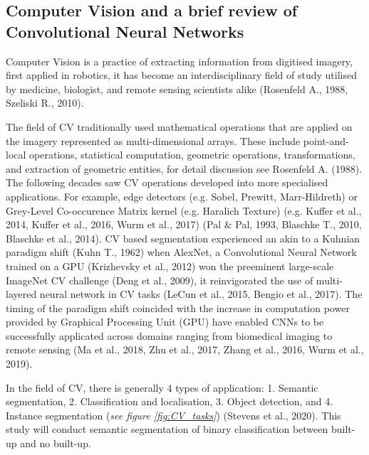 \documentclass[11pt, a4paper, twoside]{report}
\begin{document}
\subsection{Computer Vision and a brief review of Convolutional Neural Networks}\label{CVinBS}

Computer Vision is a practice of extracting information from digitised imagery, first applied in robotics, it has become an interdisciplinary field of study utilised by medicine, biologist, and remote sensing scientists alike (Rosenfeld A., 1988, Szeliski R., 2010).\\\par

The field of CV traditionally used mathematical operations that are applied on the imagery represented as multi-dimensional arrays. These include point-and-local operations, statistical computation, geometric operations, transformations, and extraction of geometric entities, for detail discussion see Rosenfeld A. (1988). The following decades saw CV operations developed into more specialised applications. For example, edge detectors (e.g. Sobel, Prewitt, Marr-Hildreth) or Grey-Level Co-occurence Matrix kernel (e.g. Haralich Texture) (e.g. Kuffer et al., 2014, Kuffer et al., 2016, Wurm et al., 2017) (Pal \& Pal, 1993, Blaschke T., 2010, Blaschke et al., 2014). CV based segmentation experienced an akin to a Kuhnian paradigm shift (Kuhn T., 1962) when AlexNet, a Convolutional Neural Network trained on a GPU (Krizhevsky et al., 2012) won the preeminent large-scale ImageNet CV challenge (Deng et al., 2009), it reinvigorated the use of multi-layered neural network in CV tasks (LeCun et al., 2015, Bengio et al., 2017). The timing of the paradigm shift coincided with the increase in computation power provided by Graphical Processing Unit (GPU) have enabled CNNs to be successfully applicated across domains ranging from biomedical imaging to remote sensing (Ma et al., 2018, Zhu et al., 2017, Zhang et al., 2016, Wurm et al., 2019).\\\par

In the field of CV, there is generally 4 types of application: 1. Semantic segmentation, 2. Classification and localisation, 3. Object detection, and 4. Instance segmentation (\textit{see figure {\ref{fig:CV_tasks}}}) (Stevens et al., 2020). This study will conduct semantic segmentation of binary classification between built-up and no built-up.\\\par
\end{document}
